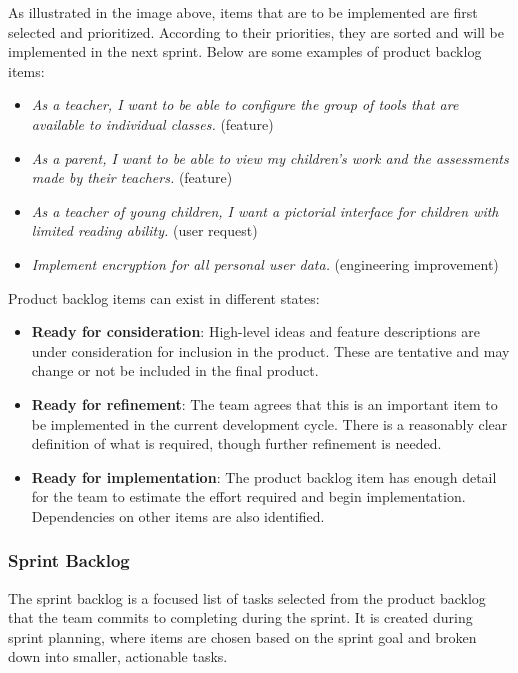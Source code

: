As illustrated in the image above, items that are to be implemented are first selected and prioritized. According to their priorities, they are sorted and will be implemented in the next sprint. Below are some examples of product backlog items:

\begin{itemize}
    \item \textit{As a teacher, I want to be able to configure the group of tools that are available to individual classes.} (feature)
    \item \textit{As a parent, I want to be able to view my children's work and the assessments made by their teachers.} (feature)
    \item \textit{As a teacher of young children, I want a pictorial interface for children with limited reading ability.} (user request)
    \item \textit{Implement encryption for all personal user data.} (engineering improvement)
\end{itemize}

\newpage

\noindent Product backlog items can exist in different states:

\begin{itemize}
	\item \textbf{Ready for consideration}: High-level ideas and feature descriptions are under consideration for inclusion in the product. These are tentative and may change or not be included in the final product.
	\item \textbf{Ready for refinement}: The team agrees that this is an important item to be implemented in the current development cycle. There is a reasonably clear definition of what is required, though further refinement is needed.
	\item \textbf{Ready for implementation}: The product backlog item has enough detail for the team to estimate the effort required and begin implementation. Dependencies on other items are also identified.
\end{itemize}

\subsubsection{Sprint Backlog}

The sprint backlog is a focused list of tasks selected from the product backlog that the team commits to completing during the sprint. It is created during sprint planning, where items are chosen based on the sprint goal and broken down into smaller, actionable tasks.

